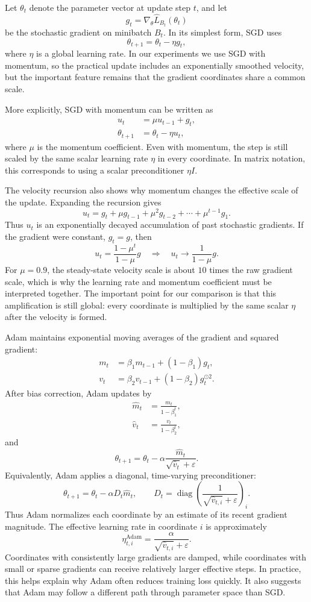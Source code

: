 \documentclass[11pt]{article}
\begin{document}
Let $\theta_t$ denote the parameter vector at update step $t$, and let
\[
g_t = \nabla_\theta \widehat L_{B_t}(\theta_t)
\]
be the stochastic gradient on minibatch $B_t$. In its simplest form, SGD uses
\[
\theta_{t+1} = \theta_t - \eta g_t,
\]
where $\eta$ is a global learning rate. In our experiments we use SGD with momentum, so the practical update includes an exponentially smoothed velocity, but the important feature remains that the gradient coordinates share a common scale.

More explicitly, SGD with momentum can be written as
\begin{align}
u_t &= \mu u_{t-1} + g_t,\\
\theta_{t+1} &= \theta_t - \eta u_t,
\end{align}
where $\mu$ is the momentum coefficient. Even with momentum, the step is still scaled by the same scalar learning rate $\eta$ in every coordinate. In matrix notation, this corresponds to using a scalar preconditioner $\eta I$.

The velocity recursion also shows why momentum changes the effective scale of the update. Expanding the recursion gives
\[
u_t
= g_t+\mu g_{t-1}+\mu^2 g_{t-2}+\cdots+\mu^{t-1}g_1.
\]
Thus $u_t$ is an exponentially decayed accumulation of past stochastic gradients. If the gradient were constant, $g_t=g$, then
\[
u_t
= \frac{1-\mu^t}{1-\mu}g
\quad\Longrightarrow\quad
u_t\to \frac{1}{1-\mu}g.
\]
For $\mu=0.9$, the steady-state velocity scale is about $10$ times the raw gradient scale, which is why the learning rate and momentum coefficient must be interpreted together. The important point for our comparison is that this amplification is still global: every coordinate is multiplied by the same scalar $\eta$ after the velocity is formed.

Adam maintains exponential moving averages of the gradient and squared gradient:
\begin{align}
m_t &= \beta_1 m_{t-1} + (1-\beta_1)g_t,\\
v_t &= \beta_2 v_{t-1} + (1-\beta_2)g_t^{\odot 2}.
\end{align}
After bias correction, Adam updates by
\begin{align}
\hat m_t &= \frac{m_t}{1-\beta_1^t},\\
\hat v_t &= \frac{v_t}{1-\beta_2^t},
\end{align}
and
\[
\theta_{t+1}
= \theta_t - \alpha \frac{\hat m_t}{\sqrt{\hat v_t}+\varepsilon}.
\]
Equivalently, Adam applies a diagonal, time-varying preconditioner:
\[
\theta_{t+1}
= \theta_t - \alpha D_t \hat m_t,
\qquad
D_t = \operatorname{diag}\left(\frac{1}{\sqrt{\hat v_{t,i}}+\varepsilon}\right)_i.
\]
Thus Adam normalizes each coordinate by an estimate of its recent gradient magnitude. The effective learning rate in coordinate $i$ is approximately
\[
\eta_{t,i}^{\mathrm{Adam}}
= \frac{\alpha}{\sqrt{\hat v_{t,i}}+\varepsilon}.
\]
Coordinates with consistently large gradients are damped, while coordinates with small or sparse gradients can receive relatively larger effective steps. In practice, this helps explain why Adam often reduces training loss quickly. It also suggests that Adam may follow a different path through parameter space than SGD.
\end{document}
